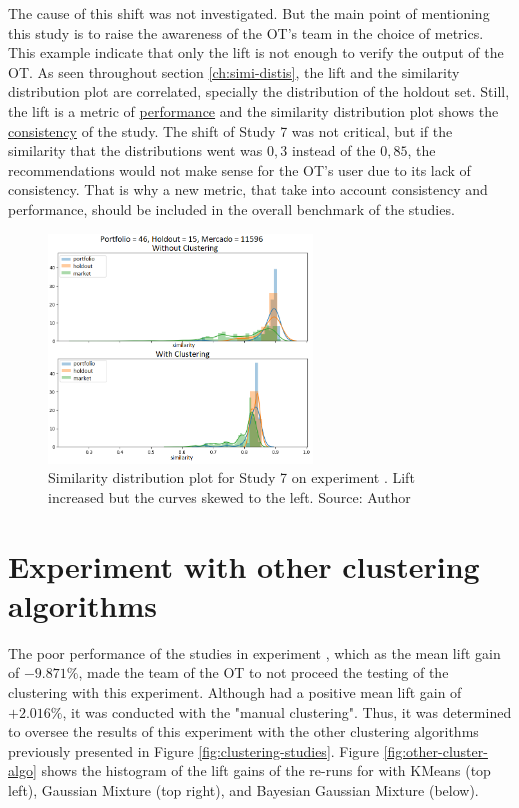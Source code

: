The cause of this shift was not investigated. But the main point of mentioning this study is to raise the awareness of the OT's team in the choice of metrics. This example indicate that only the lift is not enough to verify the output of the OT. As seen throughout section \ref{ch:simi-distis}, the lift and the similarity distribution plot are correlated, specially the distribution of the holdout set. Still, the lift is a metric of \underline{performance} and the similarity distribution plot shows the \underline{consistency} of the study. The shift of Study 7 was not critical, but if the similarity that the distributions went was $0,3$ instead of the $0,85$, the recommendations would not make sense for the OT's user due to its lack of consistency. That is why a new metric, that take into account consistency and performance, should be included in the overall benchmark of the studies.

\begin{figure}[h]
   \centering
   \includegraphics[width=7cm]{fig/ch4-worth-mentioning-study-7.png}
   \caption{Similarity distribution plot for Study 7 on experiment \nameExperimentII{}. Lift increased but the curves skewed to the left. Source: Author}
   \label{fig:worth-mentioning-study-7}
\end{figure}

\section{Experiment \nameExperimentII{} with other clustering algorithms}

The poor performance of the studies in experiment \nameExperimentI{}, which as the mean lift gain of $-9.871\%$, made the team of the OT to not proceed the testing of the clustering with this experiment. Although \nameExperimentII{} had a positive mean lift gain of $+2.016\%$, it was conducted with the "manual clustering". Thus, it was determined to oversee the results of this experiment with the other clustering algorithms previously presented in Figure \ref{fig:clustering-studies}. Figure \ref{fig:other-cluster-algo} shows the histogram of the lift gains of the re-runs for \nameExperimentII{} with KMeans (top left), Gaussian Mixture (top right), and Bayesian Gaussian Mixture (below).

